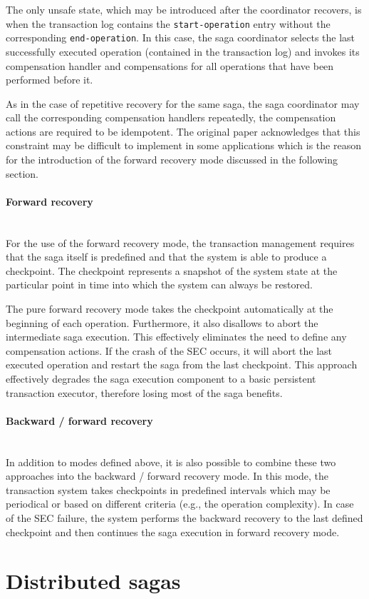 \documentclass[oneside,
  digital, %
  table,   %
  lof,     %
  lot,     %
]{fithesis3}
\newcommand{\newlinepar}[1]{\paragraph{#1}\needspace{3\baselineskip}\mbox{}\\}
\begin{document}
The only unsafe state, which may be introduced after the coordinator recovers, is when the transaction log contains the \texttt{start-operation} entry without the corresponding \texttt{end-operation}. In this case, the saga coordinator selects the last successfully executed operation (contained in the transaction log) and invokes its compensation handler and compensations for all operations that have been performed before it.

As in the case of repetitive recovery for the same saga, the saga coordinator may call the corresponding compensation handlers repeatedly, the compensation actions are required to be idempotent. The original paper acknowledges that this constraint may be difficult to implement in some applications which is the reason for the introduction of the forward recovery mode discussed in the following section.

\newlinepar{Forward recovery}

For the use of the forward recovery mode, the transaction management requires that the saga itself is predefined and that the system is able to produce a checkpoint. The checkpoint represents a snapshot of the system state at the particular point in time into which the system can always be restored.

The pure forward recovery mode takes the checkpoint automatically at the beginning of each operation. Furthermore, it also disallows to abort the intermediate saga execution. This effectively eliminates the need to define any compensation actions. If the crash of the SEC occurs, it will abort the last executed operation and restart the saga from the last checkpoint. This approach effectively degrades the saga execution component to a basic persistent transaction executor, therefore losing most of the saga benefits.

\newlinepar{Backward / forward recovery}

In addition to modes defined above, it is also possible to combine these two approaches into the backward / forward recovery mode. In this mode, the transaction system takes checkpoints in predefined intervals which may be periodical or based on different criteria (e.g., the operation complexity). In case of the SEC failure, the system performs the backward recovery to the last defined checkpoint and then continues the saga execution in forward recovery mode.

\section{Distributed sagas}
\end{document}
